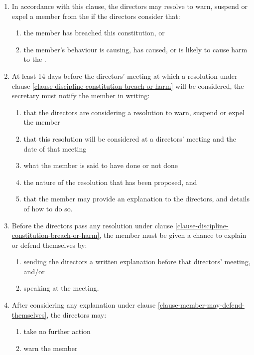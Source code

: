 \documentclass[a4paper]{article}
\let\emph\relax
\begin{document}
\begin{enumerate}
\item In accordance with this clause, the directors may resolve to warn, suspend or expel a member from the \emph{company} if the directors consider that:\label{clause-discipline-constitution-breach-or-harm}
    \begin{enumerate}
    \item the member has breached this constitution, or
    \item the member's behaviour is causing, has caused, or is likely to cause harm to the \emph{company}.
    \end{enumerate}
\item At least 14 days before the directors' meeting at which a resolution under clause \ref{clause-discipline-constitution-breach-or-harm} will be considered, the secretary must notify the member in writing:
    \begin{enumerate}
    \item that the directors are considering a resolution to warn, suspend or expel the member
    \item that this resolution will be considered at a directors' meeting and the date of that meeting
    \item what the member is said to have done or not done
    \item the nature of the resolution that has been proposed, and
    \item that the member may provide an explanation to the directors, and details of how to do so.
    \end{enumerate}
\item Before the directors pass any resolution under clause \ref{clause-discipline-constitution-breach-or-harm}, the member must be given a chance to explain or defend themselves by:\label{clause-member-may-defend-themselves}
    \begin{enumerate}
    \item sending the directors a written explanation before that directors' meeting, and/or
    \item speaking at the meeting.
    \end{enumerate}
\item After considering any explanation under clause \ref{clause-member-may-defend-themselves}, the directors may:\label{clause-director-discipline-actions}
    \begin{enumerate}
    \item take no further action
    \item warn the member

\end{enumerate}
\end{enumerate}
\end{document}
